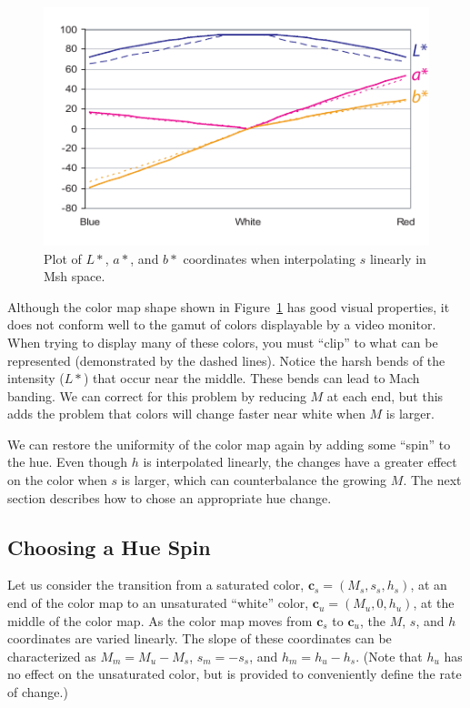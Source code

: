 \documentclass{acmsiggraph}               %
\newcommand{\Msh}{Msh\xspace}
\newcommand*{\cvec}[1]{\mathbf{#1}}
\begin{document}
\begin{figure}
  \centering
  \includegraphics{images/LinearMshPlot}
  \caption{Plot of $L*$, $a*$, and $b*$ coordinates when interpolating $s$
    linearly in \Msh space.}
  \label{fig:s_plot}
\end{figure}

Although the color map shape shown in Figure~\ref{fig:s_plot} has good
visual properties, it does not conform well to the gamut of colors
displayable by a video monitor.  When trying to display many of these
colors, you must ``clip'' to what can be represented (demonstrated by the
dashed lines).  Notice the harsh bends of the intensity ($L*$) that occur
near the middle.  These bends can lead to Mach banding.  We can correct for
this problem by reducing $M$ at each end, but this adds the problem that
colors will change faster near white when $M$ is larger.

We can restore the uniformity of the color map again by adding some
``spin'' to the hue.  Even though $h$ is interpolated linearly, the changes
have a greater effect on the color when $s$ is larger, which can
counterbalance the growing $M$.  The next section describes how to chose an
appropriate hue change.

\subsection{Choosing a Hue Spin}
\label{sec:ChoosingAHueSpin}

Let us consider the transition from a saturated color, $\cvec{c}_s=(M_s,
s_s, h_s)$, at an end of the color map to an unsaturated ``white'' color,
$\cvec{c}_u=(M_u, 0, h_u)$, at the middle of the color map.  As the
color map moves from $\cvec{c}_s$ to $\cvec{c}_u$, the $M$, $s$, and $h$
coordinates are varied linearly.  The slope of these coordinates can be
characterized as $M_m = M_u - M_s$, $s_m = -s_s$, and $h_m = h_u - h_s$.
(Note that $h_u$ has no effect on the unsaturated color, but is provided to
conveniently define the rate of change.)
\end{document}
